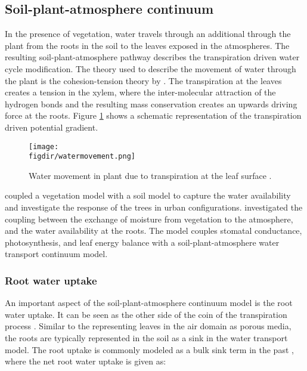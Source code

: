 \subsection{Soil-plant-atmosphere continuum}

In the presence of vegetation, water travels through an additional through the plant from the roots in the soil to the leaves exposed in the atmospheres. The resulting soil-plant-atmosphere pathway describes the transpiration driven water cycle modification. The theory used to describe the movement of water through the plant is the cohesion-tension theory by \cite{Dixon1895}. The transpiration at the leaves creates a tension in the xylem, where the inter-molecular attraction of the hydrogen bonds and the resulting mass conservation creates an upwards driving force at the roots. Figure \ref{fig:watermovement} shows a schematic representation of the transpiration driven potential gradient.  

	 \begin{figure}[t]
	 	\centering
	 	\texttt{[image: \\figdir/watermovement.png]}
	 	\caption{Water movement in plant due to transpiration at the leaf surface \citep{Sawinski2011}.}
	 	\label{fig:watermovement}
	 \end{figure}

\cite{Bruse1998} coupled a vegetation model with a soil model to capture the water availability and investigate the response of the trees in urban configurations. \cite{Tuzet2003} investigated the coupling between the exchange of moisture from vegetation to the atmosphere, and the water availability at the roots. The model couples stomatal conductance, photosynthesis, and leaf energy balance with a soil-plant-atmosphere water transport continuum model. 

\subsubsection*{Root water uptake}

An important aspect of the soil-plant-atmosphere continuum model is the root water uptake. It can be seen as the other side of the coin of the transpiration process \citep{Clark2015}. Similar to the representing leaves in the air domain as porous media, the roots are typically represented in the soil as a sink in the water transport model. The root uptake is commonly modeled as a bulk sink term in the past \citep{Hopmans2002,Vrugt2001}, where the net root water uptake is given as:
	 
